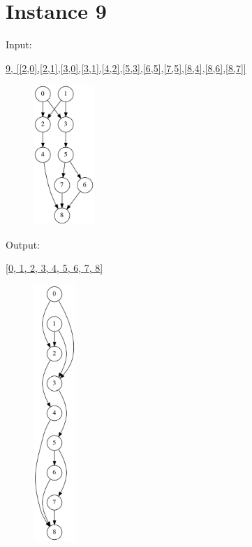 \documentclass[10pt]{article}
\begin{document}
\newpage

\section*{Instance 9}

\squishlist
  \item \parbox{40pt}{Input:}  \url{9, [[2,0],[2,1],[3,0],[3,1],[4,2],[5,3],[6,5],[7,5],[8,4],[8,6],[8,7]]}
\squishend
\begin{figure}[h!]
  \hspace{50pt}
  \includegraphics[width=65pt]{Input/Graph_9.gv.png}
\end{figure}

\squishlist
  \item \parbox{40pt}{Output:} \url{[0, 1, 2, 3, 4, 5, 6, 7, 8]}
\squishend
\begin{figure}[h!]
  \hspace{50pt}
  \includegraphics[width=45pt]{Output/Graph_9_soln.gv.png}
\end{figure}
\end{document}
